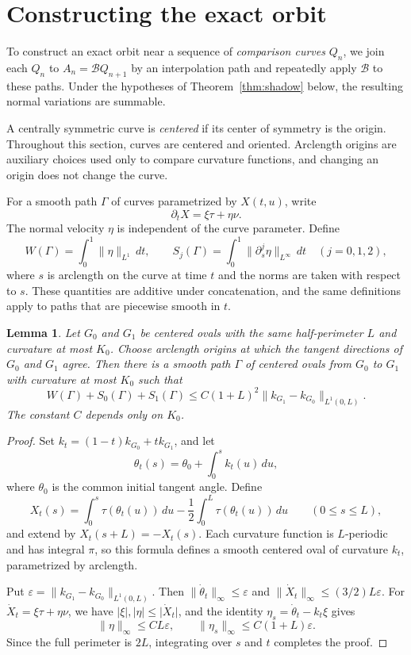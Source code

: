 \documentclass[11pt]{article}
\numberwithin{equation}{section}
\newtheorem{lemma}[theorem]{Lemma}
\newcommand{\Bmap}{\mathcal B}
\newcommand{\eps}{\varepsilon}
\newcommand{\abs}[1]{\lvert #1\rvert}
\newcommand{\norm}[1]{\lVert #1\rVert}
\begin{document}
\section{Constructing the exact orbit}\label{sec:shadow}

To construct an exact orbit near a sequence of \emph{comparison curves}
\(Q_n\), we join each \(Q_n\) to \(A_n=\Bmap Q_{n+1}\) by an interpolation path
and repeatedly apply \(\Bmap\) to these paths. Under the hypotheses of
Theorem~\ref{thm:shadow} below, the resulting normal variations are summable.

A centrally symmetric curve is \emph{centered} if its center of symmetry is
the origin. Throughout this section, curves are centered and oriented.
Arclength origins are auxiliary choices used only to compare curvature
functions, and changing an origin does not change the curve.

For a smooth path \(\Gamma\) of curves parametrized by \(X(t,u)\), write
\[
  \partial_tX=\xi\tau+\eta\nu.
\]
The normal velocity \(\eta\) is independent of the curve parameter. Define
\[
  W(\Gamma)=\int_0^1\norm{\eta}_{L^1}\,dt,\qquad
  S_j(\Gamma)=\int_0^1\norm{\partial_s^j\eta}_{L^\infty}\,dt
  \quad(j=0,1,2),
\]
where \(s\) is arclength on the curve at time \(t\) and the norms are taken
with respect to \(s\). These quantities are additive under concatenation, and
the same definitions apply to paths that are piecewise smooth in \(t\).

\begin{lemma}\label{lem:interpolation}
Let \(G_0\) and \(G_1\) be centered ovals with the same
half-perimeter \(L\) and curvature at most \(K_0\). Choose arclength origins
at which the tangent directions of \(G_0\) and \(G_1\) agree. Then there is a
smooth path \(\Gamma\) of centered ovals from \(G_0\) to \(G_1\) with
curvature at most \(K_0\) such that
\[
  W(\Gamma)+S_0(\Gamma)+S_1(\Gamma)
  \leq C(1+L)^2\norm{k_{G_1}-k_{G_0}}_{L^1(0,L)}.
\]
The constant \(C\) depends only on \(K_0\).
\end{lemma}

\begin{proof}
Set \(k_t=(1-t)k_{G_0}+tk_{G_1}\), and let
\[
  \theta_t(s)=\theta_0+\int_0^s k_t(u)\,du,
\]
where \(\theta_0\) is the common initial tangent angle. Define
\[
  X_t(s)=\int_0^s\tau(\theta_t(u))\,du
      -\frac12\int_0^L\tau(\theta_t(u))\,du
  \qquad(0\leq s\leq L),
\]
and extend by \(X_t(s+L)=-X_t(s)\). Each curvature function is
\(L\)-periodic and has integral \(\pi\), so this formula defines a smooth
centered oval of curvature \(k_t\), parametrized by arclength.

Put \(\eps=\norm{k_{G_1}-k_{G_0}}_{L^1(0,L)}\). Then
\(\norm{\dot\theta_t}_\infty\leq\eps\) and
\(\norm{\dot X_t}_\infty\leq(3/2)L\eps\). For
\(\dot X_t=\xi\tau+\eta\nu\), we have \(\abs{\xi},\abs{\eta}\leq\abs{\dot X_t}\),
and the identity \(\eta_s=\dot\theta_t-k_t\xi\) gives
\[
  \norm{\eta}_\infty\leq CL\eps,\qquad
  \norm{\eta_s}_\infty\leq C(1+L)\eps.
\]
Since the full perimeter is \(2L\), integrating over \(s\) and \(t\) completes
the proof.
\end{proof}
\end{document}
